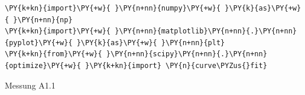 

    
    \begin{tcolorbox}[breakable, size=fbox, boxrule=1pt, pad at break*=1mm,colback=cellbackground, colframe=cellborder]
\begin{Verbatim}[commandchars=\\\{\}]
\PY{k+kn}{import}\PY{+w}{ }\PY{n+nn}{numpy}\PY{+w}{ }\PY{k}{as}\PY{+w}{ }\PY{n+nn}{np}
\PY{k+kn}{import}\PY{+w}{ }\PY{n+nn}{matplotlib}\PY{n+nn}{.}\PY{n+nn}{pyplot}\PY{+w}{ }\PY{k}{as}\PY{+w}{ }\PY{n+nn}{plt}
\PY{k+kn}{from}\PY{+w}{ }\PY{n+nn}{scipy}\PY{n+nn}{.}\PY{n+nn}{optimize}\PY{+w}{ }\PY{k+kn}{import} \PY{n}{curve\PYZus{}fit}
\end{Verbatim}
\end{tcolorbox}

    Messung A1.1

